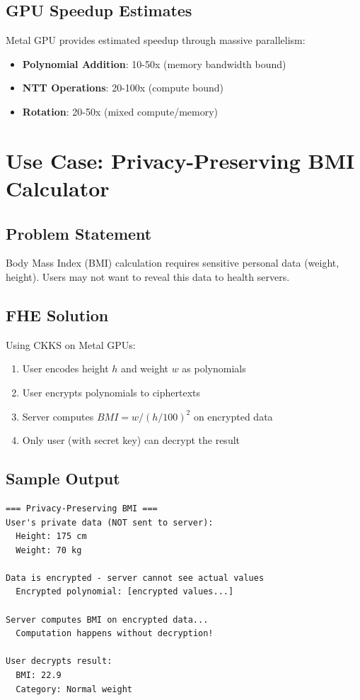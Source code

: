 \documentclass[11pt,oneside]{article}
\begin{document}
\subsection{GPU Speedup Estimates}

Metal GPU provides estimated speedup through massive parallelism:
\begin{itemize}
    \item \textbf{Polynomial Addition}: 10-50x (memory bandwidth bound)
    \item \textbf{NTT Operations}: 20-100x (compute bound)
    \item \textbf{Rotation}: 20-50x (mixed compute/memory)
\end{itemize}

\section{Use Case: Privacy-Preserving BMI Calculator}

\subsection{Problem Statement}

Body Mass Index (BMI) calculation requires sensitive personal data (weight, height). Users may not want to reveal this data to health servers.

\subsection{FHE Solution}

Using CKKS on Metal GPUs:

\begin{enumerate}
    \item User encodes height $h$ and weight $w$ as polynomials
    \item User encrypts polynomials to ciphertexts
    \item Server computes $BMI = w / (h/100)^2$ on encrypted data
    \item Only user (with secret key) can decrypt the result
\end{enumerate}

\subsection{Sample Output}

\begin{verbatim}
=== Privacy-Preserving BMI ===
User's private data (NOT sent to server):
  Height: 175 cm
  Weight: 70 kg

Data is encrypted - server cannot see actual values
  Encrypted polynomial: [encrypted values...]

Server computes BMI on encrypted data...
  Computation happens without decryption!

User decrypts result:
  BMI: 22.9
  Category: Normal weight
\end{verbatim}
\end{document}
